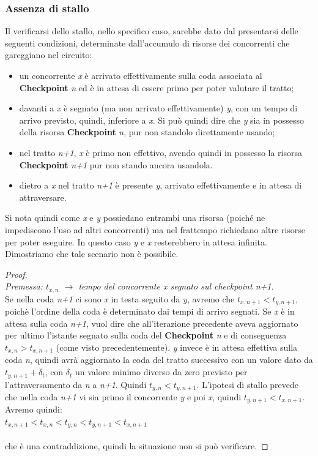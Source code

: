 \subsubsection{Assenza di stallo}
Il verificarsi dello stallo, nello specifico caso, sarebbe dato dal presentarsi
delle seguenti condizioni, determinate dall'accumulo di risorse dei concorrenti che gareggiano nel circuito:
\begin{itemize}
\item un concorrente \emph{x} è arrivato effettivamente sulla coda associata al \textbf{Checkpoint} \emph{n} ed
è in attesa di essere primo per poter valutare il tratto;
\item davanti a \emph{x} è segnato (ma non arrivato effettivamente) \emph{y}, con un tempo di arrivo previsto, quindi, inferiore a \emph{x}. 
Si può quindi dire che \emph{y} sia in possesso della risorsa \textbf{Checkpoint} \emph{n}, pur non standolo direttamente usando;
\item nel tratto \emph{n+1}, \emph{x} è primo non effettivo, avendo quindi in possesso la risorsa \textbf{Checkpoint} \emph{n+1} pur
non stando ancora usandola.
\item dietro a \emph{x} nel tratto \emph{n+1} è presente \emph{y}, arrivato effettivamente e in attesa di attraversare.
\end{itemize}
Si nota quindi come \emph{x} e \emph{y} possiedano entrambi una risorsa (poiché ne impediscono l'uso ad altri concorrenti)
ma nel frattempo richiedano altre risorse per poter eseguire. In questo caso \emph{y} e \emph{x} resterebbero in attesa infinita.
Dimostriamo che tale scenario non è possibile.
\begin{proof}
\textcolor{white}{42}\\
\emph{Premessa: $t_{x,n}$ $\rightarrow$ tempo del concorrente \emph{x} segnato sul
checkpoint \emph{n+1}.}\\
	Se nella coda \emph{n+1} ci sono \emph{x} in testa seguito da \emph{y}, avremo che
$t_{x,n+1}<t_{y,n+1}$, poich\`{e} l'ordine della coda \`{e} 
	determinato dai tempi di arrivo segnati.
	Se \emph{x} \`{e} in attesa sulla coda \emph{n+1}, vuol dire che all'iterazione precedente aveva aggiornato per
ultimo l'istante segnato sulla coda del \textbf{Checkpoint} \emph{n} e di conseguenza $t_{x,n}>t_{x,n+1}$ (come visto precedentemente).
	\emph{y} invece \`{e} in attesa effettiva sulla coda \emph{n}, quindi avr\`{a}
aggiornato la coda del tratto successivo con un valore dato da $t_{y,n+1} + \delta_t$, 
	con $ \delta_t$ un valore minimo diverso da zero previsto per
l'attraversamento da \emph{n} a \emph{n+1}. Quindi $t_{y,n}<t_{y,n+1}$.
	L'ipotesi di stallo prevede che nella coda \emph{n+1} vi sia primo il concorrente \emph{y} e poi \emph{x},
quindi $t_{y,n+1}<t_{x,n+1}$.
	Avremo quindi:\\
	$t_{x,n+1}<t_{x,n}<t_{y,n}<t_{y,n+1}<t_{x,n+1}$\\\\
	che \`{e} una contraddizione, quindi la situazione non si pu\`{o}
verificare.
\end{proof}
